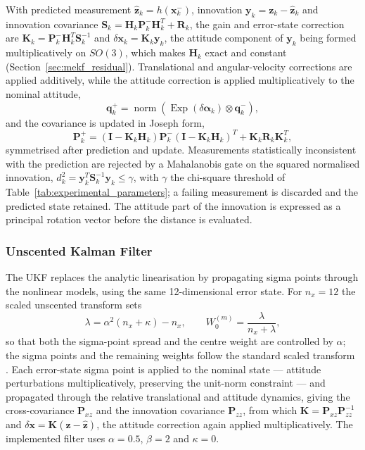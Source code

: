 With predicted measurement $\hat{\mathbf{z}}_{k}=h(\mathbf{x}_{k}^{-})$,
innovation $\mathbf{y}_{k}=\mathbf{z}_{k}-\hat{\mathbf{z}}_{k}$ and
innovation covariance $\mathbf{S}_{k}=\mathbf{H}_{k}\mathbf{P}_{k}^{-}
\mathbf{H}_{k}^{T}+\mathbf{R}_{k}$, the gain and error-state correction are
$\mathbf{K}_{k}=\mathbf{P}_{k}^{-}\mathbf{H}_{k}^{T}\mathbf{S}_{k}^{-1}$ and
$\delta\mathbf{x}_{k}=\mathbf{K}_{k}\mathbf{y}_{k}$, the attitude component of $\mathbf{y}_k$ being formed multiplicatively on
$SO(3)$, which makes $\mathbf{H}_k$ exact and constant
(Section~\ref{sec:mekf_residual}). Translational and angular-velocity
corrections are applied additively, while the attitude correction is applied
multiplicatively to the nominal attitude,
\begin{equation}
    \mathbf{q}_{k}^{+}
    =
    \operatorname{norm}
    \left(
        \operatorname{Exp}(\delta\boldsymbol{\alpha}_{k})
        \otimes
        \mathbf{q}_{k}^{-}
    \right),
\end{equation}
and the covariance is updated in Joseph form,
\begin{equation}
    \mathbf{P}_{k}^{+}
    =
    (\mathbf{I}-\mathbf{K}_{k}\mathbf{H}_{k})
    \mathbf{P}_{k}^{-}
    (\mathbf{I}-\mathbf{K}_{k}\mathbf{H}_{k})^{T}
    +
    \mathbf{K}_{k}\mathbf{R}_{k}\mathbf{K}_{k}^{T},
\end{equation}
symmetrised after prediction and update. Measurements statistically
inconsistent with the prediction are rejected by a Mahalanobis gate on the
squared normalised innovation,
$d_k^2=\mathbf{y}_{k}^{T}\mathbf{S}_{k}^{-1}\mathbf{y}_{k}\leq\gamma$, with
$\gamma$ the chi-square threshold of
Table~\ref{tab:experimental_parameters}; a failing measurement is discarded
and the predicted state retained. The attitude part of the innovation is
expressed as a principal rotation vector before the distance is evaluated.

\subsubsection{Unscented Kalman Filter}

The UKF replaces the analytic linearisation by propagating sigma points
through the nonlinear models, using the same 12-dimensional error state. For
$n_x=12$ the scaled unscented transform sets
\begin{equation}
    \lambda = \alpha^2(n_x+\kappa)-n_x,
    \qquad
    W_0^{(m)} = \frac{\lambda}{n_x+\lambda},
\end{equation}
so that both the sigma-point spread and the centre weight are controlled by
$\alpha$; the sigma points and the remaining weights
follow the standard scaled transform \cite{julier2004}. Each error-state sigma
point is applied to the nominal state --- attitude perturbations
multiplicatively, preserving the unit-norm constraint --- and propagated
through the relative translational and attitude dynamics, giving the
cross-covariance $\mathbf{P}_{xz}$ and the innovation covariance
$\mathbf{P}_{zz}$, from which
$\mathbf{K}=\mathbf{P}_{xz}\mathbf{P}_{zz}^{-1}$ and
$\delta\mathbf{x}=\mathbf{K}(\mathbf{z}-\hat{\mathbf{z}})$, the attitude
correction again applied multiplicatively. The implemented filter uses
$\alpha=0.5$, $\beta=2$ and $\kappa=0$.

